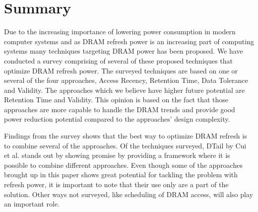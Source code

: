 \section{Summary} 
\label{sec:sum}
Due to the increasing importance of lowering power consumption in modern computer systems and as DRAM refresh power is an increasing part of computing systems many techniques targeting DRAM power has been proposed. We have conducted a survey comprising of several of these proposed techniques that optimize DRAM refresh power. The surveyed techniques are based on one or several of the four approaches, Access Recency, Retention Time, Data Tolerance and Validity. The approaches which we believe have higher future potential are Retention Time and Validity. This opinion is based on the fact that those approaches are more capable to handle the DRAM trends and provide good power reduction potential compared to the approaches' design complexity. 

Findings from the survey shows that the best way to optimize DRAM refresh is to combine several of the approaches. Of the techniques surveyed, DTail by Cui et al. stands out by showing promise by providing a framework where it is possible to combine different approaches. Even though some of the approaches brought up in this paper shows great potential for tackling the problem with refresh power, it is important to note that their use only are a part of the solution. Other ways not surveyed, like scheduling of DRAM access, will also play an important role.    
